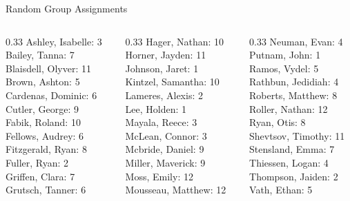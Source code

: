 \documentclass[10pt]{beamer}
\begin{document}
\begin{frame}{Random Group Assignments}
\begin{columns}
\begin{column}{0.33\textwidth}
Ashley, Isabelle: 3 \\ 
Bailey, Tanna: 7 \\ 
Blaisdell, Olyver: 11 \\ 
Brown, Ashton: 5 \\ 
Cardenas, Dominic: 6 \\ 
Cutler, George: 9 \\ 
Fabik, Roland: 10 \\ 
Fellows, Audrey: 6 \\ 
Fitzgerald, Ryan: 8 \\ 
Fuller, Ryan: 2 \\ 
Griffen, Clara: 7 \\ 
Grutsch, Tanner: 6 \\\end{column}
\begin{column}{0.33\textwidth}
Hager, Nathan: 10 \\ 
Horner, Jayden: 11 \\ 
Johnson, Jaret: 1 \\ 
Kintzel, Samantha: 10 \\ 
Lameres, Alexis: 2 \\ 
Lee, Holden: 1 \\ 
Mayala, Reece: 3 \\ 
McLean, Connor: 3 \\ 
Mcbride, Daniel: 9 \\ 
Miller, Maverick: 9 \\ 
Moss, Emily: 12 \\ 
Mousseau, Matthew: 12 \\\end{column}
\begin{column}{0.33\textwidth}
Neuman, Evan: 4 \\ 
Putnam, John: 1 \\ 
Ramos, Vydel: 5 \\ 
Rathbun, Jedidiah: 4 \\ 
Roberts, Matthew: 8 \\ 
Roller, Nathan: 12 \\ 
Ryan, Otis: 8 \\ 
Shevtsov, Timothy: 11 \\ 
Stensland, Emma: 7 \\ 
Thiessen, Logan: 4 \\ 
Thompson, Jaiden: 2 \\ 
Vath, Ethan: 5 \\\end{column}
\end{columns}
\end{frame}
\end{document}
